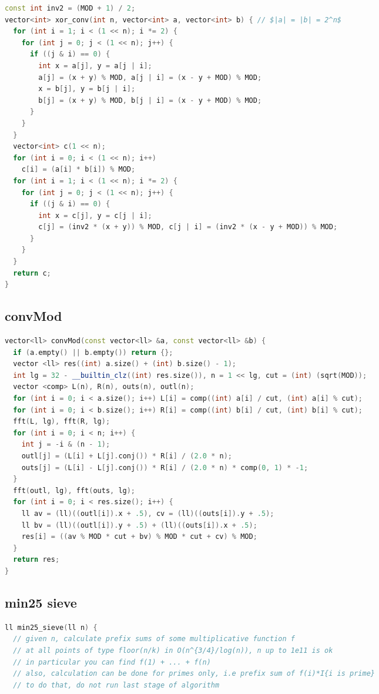 \documentclass[9pt,a4paper,landscape,twosided]{extarticle}
\begin{document}
\begin{multicols*}{3}
\begin{lstlisting}[language=C++]
const int inv2 = (MOD + 1) / 2;
vector<int> xor_conv(int n, vector<int> a, vector<int> b) { // $|a| = |b| = 2^n$
  for (int i = 1; i < (1 << n); i *= 2) {
    for (int j = 0; j < (1 << n); j++) {
      if ((j & i) == 0) {
        int x = a[j], y = a[j | i];
        a[j] = (x + y) % MOD, a[j | i] = (x - y + MOD) % MOD;
        x = b[j], y = b[j | i];
        b[j] = (x + y) % MOD, b[j | i] = (x - y + MOD) % MOD;
      }
    }
  }
  vector<int> c(1 << n);
  for (int i = 0; i < (1 << n); i++)
    c[i] = (a[i] * b[i]) % MOD;
  for (int i = 1; i < (1 << n); i *= 2) {
    for (int j = 0; j < (1 << n); j++) {
      if ((j & i) == 0) {
        int x = c[j], y = c[j | i];
        c[j] = (inv2 * (x + y)) % MOD, c[j | i] = (inv2 * (x - y + MOD)) % MOD;
      }
    }
  }
  return c;
}
\end{lstlisting}

\subsection{convMod}
\begin{lstlisting}[language=C++]
vector<ll> convMod(const vector<ll> &a, const vector<ll> &b) {
  if (a.empty() || b.empty()) return {};
  vector <ll> res((int) a.size() + (int) b.size() - 1);
  int lg = 32 - __builtin_clz((int) res.size()), n = 1 << lg, cut = (int) (sqrt(MOD));
  vector <comp> L(n), R(n), outs(n), outl(n);
  for (int i = 0; i < a.size(); i++) L[i] = comp((int) a[i] / cut, (int) a[i] % cut);
  for (int i = 0; i < b.size(); i++) R[i] = comp((int) b[i] / cut, (int) b[i] % cut);
  fft(L, lg), fft(R, lg);
  for (int i = 0; i < n; i++) {
    int j = -i & (n - 1);
    outl[j] = (L[i] + L[j].conj()) * R[i] / (2.0 * n);
    outs[j] = (L[i] - L[j].conj()) * R[i] / (2.0 * n) * comp(0, 1) * -1;
  }
  fft(outl, lg), fft(outs, lg);
  for (int i = 0; i < res.size(); i++) {
    ll av = (ll)((outl[i]).x + .5), cv = (ll)((outs[i]).y + .5);
    ll bv = (ll)((outl[i]).y + .5) + (ll)((outs[i]).x + .5);
    res[i] = ((av % MOD * cut + bv) % MOD * cut + cv) % MOD;
  }
  return res;
}
\end{lstlisting}

\subsection{min25 sieve}
\begin{lstlisting}[language=C++]
ll min25_sieve(ll n) {
  // given n, calculate prefix sums of some multiplicative function f
  // at all points of type floor(n/k) in O(n^{3/4}/log(n)), n up to 1e11 is ok
  // in particular you can find f(1) + ... + f(n)
  // also, calculation can be done for primes only, i.e prefix sum of f(i)*I{i is prime}
  // to do that, do not run last stage of algorithm


\end{lstlisting}
\end{multicols*}
\end{document}
